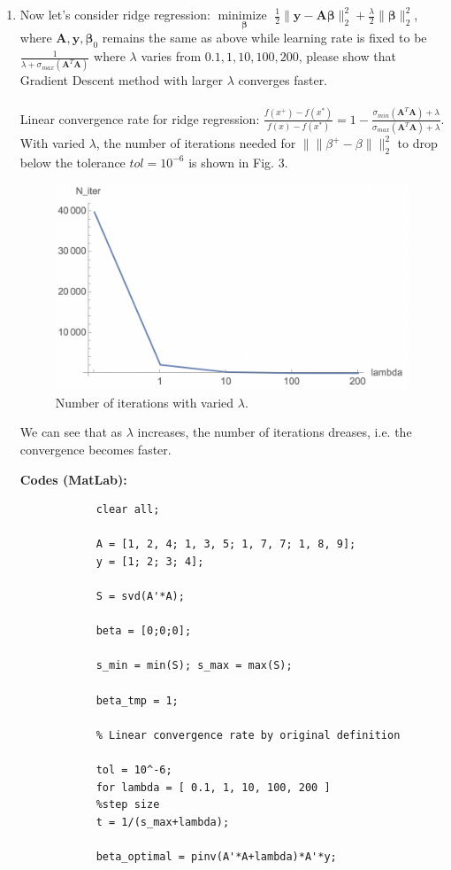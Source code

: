 \documentclass[11pt]{article}
\newcommand{\minimize}{\operatorname*{minimize\ }}
\newcommand{\mtx}[1]{\mathbf{#1}}
\newcommand{\vct}[1]{\mathbf{#1}}
\def \mA {\mtx{A}}
\def \vy {\vct{y}}
\begin{document}
\begin{enumerate}
			
		\item Now let's consider ridge regression: $\minimize \limits_{\bm{\beta}} \frac{1}{2}\|\vy-\mA\bm{\beta}\|^2_2+\frac{\lambda}{2} \|\bm{\beta}\|^2_2$, where  $\mA,\vy,\bm{\beta}_0$ remains the same as above while learning rate is fixed to be $\frac{1}{\lambda+\sigma_{max}(\mA^T\mA)}$ where $\lambda$ varies from $0.1,1,10,100,200$, please show that Gradient Descent method with larger $\lambda$ converges faster. \\\\
		Linear convergence rate for ridge regression: $\frac{f(x^+)-f(x^*)}{f(x)-f(x^*)}=1-\frac{\sigma_{min}(\mA^T\mA)+\lambda}{\sigma_{max}(\mA^T\mA)+\lambda}$. With varied $\lambda$, the number of iterations needed for $\|\|\beta^{+}-\beta\|\|_2^2$ to drop below the tolerance $tol=10^{-6}$ is shown in Fig. 3. 
		
		\begin{figure}[H] %
			\centering\includegraphics[width=0.45\linewidth]{prob3.3_iter.png}
			\caption{Number of iterations with varied $\lambda$.} %
			\label{fig:fig3}  %
		\end{figure}
		We can see that as $\lambda$ increases, the number of iterations dreases, i.e. the convergence becomes faster.
		
		\textbf{Codes (MatLab):}
		\begin{verbatim}
			clear all;
			
			A = [1, 2, 4; 1, 3, 5; 1, 7, 7; 1, 8, 9];
			y = [1; 2; 3; 4];
			
			S = svd(A'*A);
			
			beta = [0;0;0];
			
			s_min = min(S); s_max = max(S); 
			
			beta_tmp = 1;
			
			% Linear convergence rate by original definition
			
			tol = 10^-6;
			for lambda = [ 0.1, 1, 10, 100, 200 ]
			%step size
			t = 1/(s_max+lambda);
			
			beta_optimal = pinv(A'*A+lambda)*A'*y;
			

\end{verbatim}
\end{enumerate}
\end{document}
